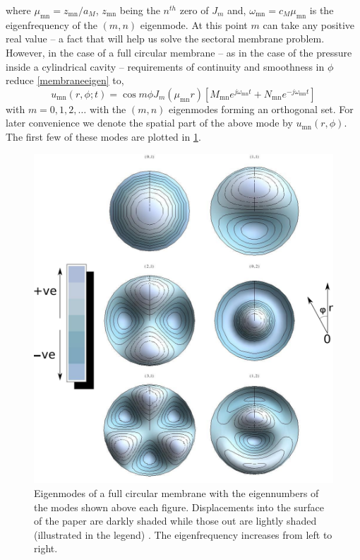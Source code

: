 where $\mu_{\mathrm{mn}}=z_{\mathrm{mn}}/a_M$, $z_{\mathrm{mn}}$ being the $n^{th}$ zero of $J_m$ and, $\omega_{\mathrm{mn}}=c_M\mu_{\mathrm{mn}}$ is
the eigenfrequency of the $(m,n)$ eigenmode. At this point $m$ can take any positive real value -- a fact that will
help us solve the sectoral membrane problem. However, in the case of a full circular membrane -- as in the case
of the pressure inside a cylindrical cavity -- requirements of continuity and smoothness in $\phi$ reduce \eqref{membraneeigen}
to,
\begin{equation}\label{circularmembraneeigen}
 u_{\mathrm{mn}}(r,\phi;t)=\cos m\phi J_m(\mu_{\mathrm{mn}} r)\left[M_{\mathrm{mn}}e^{j\omega_{\mathrm{mn}} t}+N_{\mathrm{mn}}e^{-j\omega_{\mathrm{mn}} t}\right]
\end{equation}
with $m=0,1,2,\ldots$ with the $(m,n)$ eigenmodes forming an orthogonal set. For later convenience we denote the spatial
part of the above mode by $u_{\mathrm{mn}}(r,\phi)$. The first few of these modes are plotted in \ref{circularmembraneeigenmodes}.

\begin{figure}[ht!]
 \centering
 \includegraphics[width=.7\linewidth]{Diagrams/CircularMembraneModes/circular_modes_all.png}
 \caption[Circular membrane eigenmodes]{Eigenmodes of a full circular membrane with the eigennumbers of the modes
 shown above each figure. Displacements into the surface of the paper are darkly shaded while those out are lightly shaded (illustrated in the legend) . The eigenfrequency increases from left to right.}
  \label{circularmembraneeigenmodes}
\end{figure}

